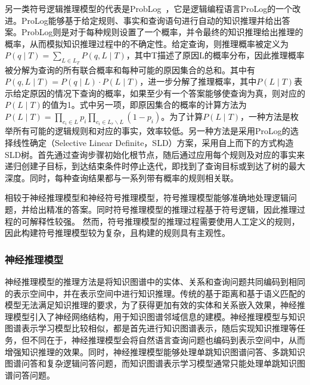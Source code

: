 \documentclass[algorithmlist, AutoFakeBold, AutoFakeSlant, figurelist, tablelist, nomlist, engineering, openany]{seuthesix} %
\begin{document}
另一类符号逻辑推理模型的代表是ProbLog~\cite{de2007problog}，它是逻辑编程语言ProLog的一个改进。ProLog能够基于给定规则、事实和查询语句进行自动的知识推理并给出答案。ProbLog则是对于每种规则设置了一个概率，并令最终的知识推理给出推理的概率，从而模拟知识推理过程中的不确定性。给定查询，则推理概率被定义为$P\left(q \mid T\right)=\sum_{L \in L_T} P(q, L \mid T)$，其中T描述了原因L的概率分布，因此推理概率被分解为查询的所有联合概率和每种可能的原因集合的总和。其中有$P(q, L \mid T)=P(q \mid L) \cdot P(L \mid T)$，进一步分解了推理概率，其中$P(L \mid T)$表示给定原因的情况下查询的概率，如果至少有一个答案能够使查询为真，则对应的$P(L \mid T)$的值为1。式中另一项，即原因集合的概率的计算方法为$P(L \mid T)=\prod_{c_i \in L} p_i \prod_{c_i \in L_r \backslash L}\left(1-p_i\right)$。为了计算$P(L \mid T)$，一种方法是枚举所有可能的逻辑规则和对应的事实，效率较低。另一种方法是采用ProLog的选择线性确定（Selective Linear Definite，SLD）方案，采用自上而下的方式构造SLD树。首先通过查询步骤初始化根节点，随后通过应用每个规则及对应的事实来递归创建子目标，到达结束条件时停止迭代，即找到了查询目标或到达了树的最大深度。同时，每种查询结果都与一系列带有概率的规则相关联。

相较于神经推理模型和神经符号推理模型，符号推理模型能够准确地处理逻辑问题，并给出精准的答案。同时符号推理模型的推理过程基于符号逻辑，因此推理过程的可解释性较强。
然而，符号推理模型的推理过程需要使用人工定义的规则，因此构建符号推理模型较为复杂，且构建的规则具有主观性。

\subsubsection{神经推理模型}
神经推理模型的推理方法是将知识图谱中的实体、关系和查询问题共同编码到相同的表示空间中，并在表示空间中进行知识推理。传统的基于距离和基于语义匹配的模型无法满足知识推理的要求，为了获得更加有效的实体和关系嵌入效果，神经推理模型引入了神经网络结构，用于知识图谱邻域信息的建模。神经推理模型与知识图谱表示学习模型比较相似，都是首先进行知识图谱表示，随后实现知识推理等任务，但不同在于，神经推理模型会将自然语言查询问题也编码到表示空间中，从而增强知识推理的效果。同时，神经推理模型能够处理单跳知识图谱问答、多跳知识图谱问答和复杂逻辑问答问题，而知识图谱表示学习模型通常只能处理单跳知识图谱问答问题。
\end{document}
